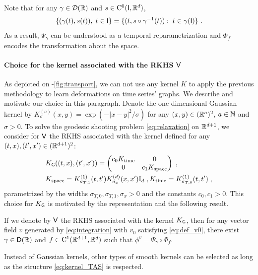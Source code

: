 \begin{remark}
  Note that for any $\gamma \in \mathcal{D}(\mathbb{R}) $ and $s\in \mathrm{C}^0(\mathsf{I},\mathbb{R}^d)$,
  \begin{equation}
    \{(\gamma(t),s(t)),\; t\in \mathsf{I} \}=\{(t,s\circ \gamma^{-1}(t)):\; t\in\gamma(\mathsf{I}) \}\; .
  \end{equation}
  As a result, $\Psi_\gamma $ can be understood as a temporal reparametrization and $\Phi_f$ encodes the transformation about the space.
\end{remark}

\vspace{-1ex}
\paragraph{Choice for the kernel associated with the RKHS $\mathsf{V}$}
\label{paragraph:kernel_V}
As depicted on -\ref{fig:transport}, we can not use any kernel $K$ to apply the previous methodology to learn deformations on time series' graphs. We describe and motivate our choice in this paragraph. Denote the one-dimensional Gaussian kernel by $K_\sigma^{(a)}(x,y)=\exp(-|x-y|^2/\sigma)$ for any $(x,y)\in (\mathbb{R}^a)^2$, $a\in \mathbb{N}$ and $\sigma>0$. To solve the geodesic shooting problem \eqref{eq:relaxation} on $\mathbb{R}^{d+1}$, we consider for $\mathsf{V}$ the RKHS associated with the kernel defined for any $(t,x),(t',x')\in (\mathbb{R}^{d+1})^2$:
\begin{align}
  \label{eq:kernel_TAS}
  &K_{\mathsf{G}}((t,x),(t',x'))=
  \begin{pmatrix}
    c_0K_{\text{time}} & 0 \\
    0 & c_1 K_{\text{space}} 
  \end{pmatrix} \; ,\\
  & K_{\text{space}}=K_{\sigma_{T,1}}^{(1)}(t,t')K_{\sigma_x}^{(d)}(x,x') \mathrm{I}_d\;,K_{\text{time}}=K_{\sigma_{T,0}}^{(1)}(t,t') \;,
\end{align}
parametrized by the widths $\sigma_{T,0},\sigma_{T,1},\sigma_x>0$ and the constants $c_0,c_1>0$. This choice for $K_{\mathsf{G}}$ is motivated by the representation  and the following result. 
\begin{lemma}
  \label{lemma:choice_of_kernel_V}
  If we denote by $\mathsf{V}$ the RKHS associated with the kernel $K_{\mathsf{G}}$, then for any vector field $v$ generated by \eqref{eq:integration} with $v_0$ satisfying \eqref{eq:def_v0}, there exist $\gamma \in \mathsf{D}(\mathbb{R}) $ and $f\in \mathrm{C}^1(\mathbb{R}^{d+1},\mathbb{R}^d)$ such that $\phi^v=\Psi_\gamma\circ\Phi_f $.
\end{lemma}
Instead of Gaussian kernels, other types of smooth kernels can be selected as long as the structure \eqref{eq:kernel_TAS} is respected.

